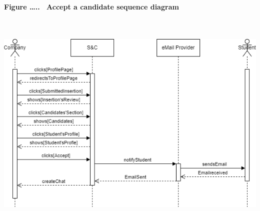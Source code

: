 \textbf{Figure \ldots..~ Accept a candidate sequence diagram}

\includegraphics[width=6.5in,height=4.33681in]{Images/image7.png}


